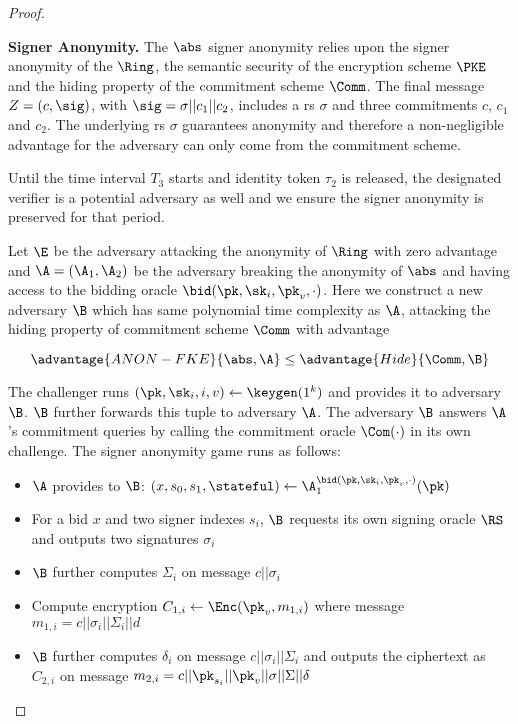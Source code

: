 \begin{proof}
\begin{description}
\item \textbf{Signer Anonymity.} The $\abs$ signer anonymity relies upon the signer anonymity of the $\Ring$, the semantic security of the encryption scheme $\PKE$ and the hiding property of the commitment scheme $\Comm$. The final message $Z = (c, \sig)$, with $\sig = \sigma || c_1 || c_2$, includes a \gls{rs} $\sigma$ and three commitments $c$, $c_1$ and $c_2$. The underlying \gls{rs} $\sigma$ guarantees anonymity and therefore a non-negligible advantage for the adversary can only come from the commitment scheme.

Until the time interval $T_3$ starts and identity token $\tau_2$ is released, the designated verifier is a potential adversary as well and we ensure the signer anonymity is preserved for that period.

Let $\E$ be the adversary attacking the anonymity of $\Ring$ with zero advantage and $\A=(\A_1,\A_2)$ be the adversary breaking the anonymity of $\abs$ and having access to the bidding oracle $\bid(\pk, \sk_i, \pk_v, \cdot)$. Here we construct a new adversary $\B$ which has same polynomial time complexity as $\A$, attacking the hiding property of commitment scheme $\Comm$ with advantage

    \begin{equation*}
        \advantage{ANON-FKE}{\abs, \A} \leq \advantage{Hide}{\Comm, \B}
    \end{equation*}
    
    The challenger runs $(\pk,\sk_i,i,v) \gets \keygen(1^k)$ and provides it to adversary $\B$. $\B$ further forwards this tuple to adversary $\A$. The adversary $\B$ answers $\A$'s commitment queries by calling the commitment oracle $\Com(\cdot)$ in its own challenge. The signer anonymity game runs as follows:
    \begin{itemize}
    \item $\A$ provides to $\B$: $(x, s_0, s_1, \stateful) \gets \A_1^{\bid(\pk, \sk_i, \pk_v, \cdot)}(\pk)$
    \item For a bid $x$ and two signer indexes $s_i$, $\B$ requests its own signing oracle $\RS$ and outputs two signatures $\sigma_i$
    \item $\B$ further computes $\Sigma_i$ on message $c||\sigma_i$
    \item Compute encryption $C_{1,i}\gets\Enc(\pk_v,m_{1,i})$ where message $m_{1,i}=c||\sigma_i||\Sigma_i||d$
    \item $\B$ further computes $\delta_i$ on
    message $c||\sigma_i||\Sigma_i$ and outputs the ciphertext as $C_{2,i}$ on message $m_{2,i} = c || \pk_{s_i} || \pk_v || \sigma || \Sigma || \delta$
    \end{itemize}
    

\end{description}
\end{proof}

